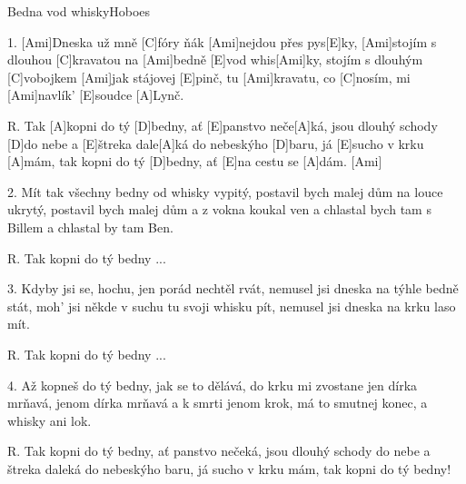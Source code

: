 \begin{song}{Bedna vod whisky}{Hoboes}

\begin{xverse}{1. }
[Ami]Dneska už mně [C]fóry ňák [Ami]nejdou přes pys[E]ky,
[Ami]stojím s dlouhou [C]kravatou na [Ami]bedně [E]vod whis[Ami]ky,
stojím s dlouhým [C]vobojkem [Ami]jak stájovej [E]pinč,
tu [Ami]kravatu, co [C]nosím, mi [Ami]navlík' [E]soudce [A]Lynč.
\end{xverse}


\begin{xverse}{R. }
Tak [A]kopni do tý [D]bedny, ať [E]panstvo neče[A]ká,
jsou dlouhý schody [D]do nebe a [E]{}štreka dale[A]ká
do nebeskýho [D]baru, já [E]sucho v krku [A]mám,
tak kopni do tý [D]bedny, ať [E]na cestu se [A]dám. [Ami]{}
\end{xverse}


\begin{xverse}{2. }
Mít tak všechny bedny od whisky vypitý,
postavil bych malej dům na louce ukrytý,
postavil bych malej dům a z vokna koukal ven
a chlastal bych tam s Billem a chlastal by tam Ben.
\end{xverse}


\begin{xverse}{R. }
Tak kopni do tý bedny ...
\end{xverse}


\begin{xverse}{3. }
Kdyby jsi se, hochu, jen porád nechtěl rvát,
nemusel jsi dneska na týhle bedně stát,
moh' jsi někde v suchu tu svoji whisku pít,
nemusel jsi dneska na krku laso mít.
\end{xverse}


\begin{xverse}{R. }
Tak kopni do tý bedny ...
\end{xverse}


\begin{xverse}{4. }
Až kopneš do tý bedny, jak se to dělává,
do krku mi zvostane jen dírka mrňavá,
jenom dírka mrňavá a k smrti jenom krok,
má to smutnej konec, a whisky ani lok.
\end{xverse}


\begin{xverse}{R. }
Tak kopni do tý bedny, ať panstvo nečeká,
jsou dlouhý schody do nebe a štreka daleká
do nebeskýho baru, já sucho v krku mám,
tak kopni do tý bedny!
\end{xverse}


\end{song}

